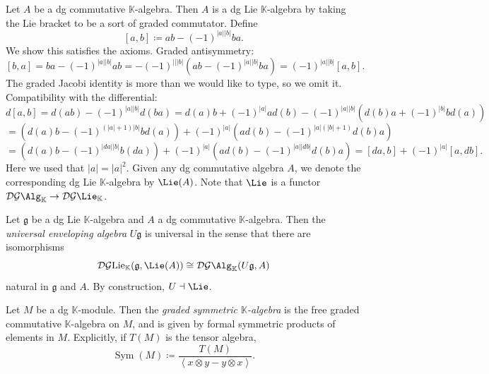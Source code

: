 \begin{remark}\label{3.3.5}
	Let $A$ be a dg commutative $\mathbb{K} $-algebra. Then $A$ is a dg Lie $\mathbb{K} $-algebra by taking the Lie bracket to be a sort of graded commutator. Define
	\[
		[a,b]\coloneqq ab-(-1)^{\left| a \right| \left| b \right| } ba
	.\]
	We show this satisfies the axioms. Graded antisymmetry:
	\[
		[b,a]=ba-(-1)^{\left| a \right| \left| b \right| } ab=-(-1)^{\left|  \right| \left| b \right| } \left( ab-(-1)^{\left| a \right| \left| b \right| } ba \right) =(-1)^{\left| a \right| \left| b \right| } [a,b]
	.\]
	The graded Jacobi identity is more than we would like to type, so we omit it. Compatibility with the differential:
	\[
		d[a,b]=d(ab) - (-1)^{\left| a \right| \left| b \right| } d(ba) = d(a)b + (-1)^{\left| a \right| } ad(b) - (-1)^{\left| a \right| \left| b \right| } \left( d(b)a + (-1)^{\left| b \right| } bd(a) \right) 
	\]
	\[
		=\left( d(a)b - (-1)^{(\left| a \right| +1)\left| b \right| } bd(a) \right) +(-1)^{\left| a \right| } \left( ad(b)-(-1)^{\left| a \right| (\left| b \right| +1)} d(b)a \right)
	\]
	\[
		=\left( d(a)b-(-1)^{\left| da \right| \left| b \right| } b(da) \right) +(-1)^{\left| a \right| } \left( ad(b)-(-1)^{\left| a \right| \left| db \right| } d(b)a \right) =[da,b]+(-1)^{\left| a \right| } [a,db]
	.\]
	Here we used that $\left| a \right| =\left| a \right| ^2$. Given any dg commutative algebra $A$, we denote the corresponding dg Lie $\mathbb{K} $-algebra by $\Lie (A)$. Note that $\Lie $ is a functor $\mathcal{D} \mathcal{G} \Alg_{\mathbb{K} } \to \mathcal{D} \mathcal{G} \Lie _\mathbb{K} $.
\end{remark}

\begin{definition}\label{3.3.6}
	Let $\mathfrak{g} $ be a dg Lie $\mathbb{K} $-algebra and $A$ a dg commutative $\mathbb{K} $-algebra. Then the \emph{universal enveloping algebra} $U\mathfrak{g} $ is universal in the sense that there are isomorphisms
	\[
		\mathcal{D} \mathcal{G}\mathrm{Lie }_\mathbb{K} (\mathfrak{g} ,\Lie (A)) \cong \mathcal{D} \mathcal{G} \Alg_{\mathbb{K} } (U\mathfrak{g} ,A)
	\]
	natural in $\mathfrak{g} $ and $A$. By construction, $U\dashv \Lie $.
\end{definition}

\begin{definition}\label{3.3.7}
	Let $M$ be a dg $\mathbb{K} $-module. Then the \emph{graded symmetric $\mathbb{K} $-algebra} is the free graded commutative $\mathbb{K} $-algebra on $M$, and is given by formal symmetric products of elements in $M$. Explicitly, if $T(M)$ is the tensor algebra,
	\[
		\operatorname{Sym} (M) \coloneqq \frac{T(M)}{\left\langle x\otimes y - y\otimes x \right\rangle } 
	.\]
\end{definition}

